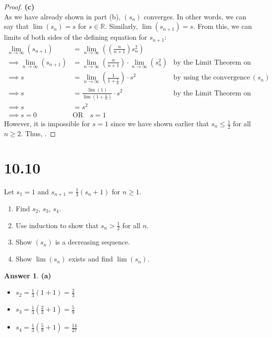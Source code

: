 \documentclass[10pt,a4paper]{article}
\theoremstyle{definition}
\newtheorem*{answer*}{Answer}
\begin{document}
\begin{proof}{\textbf{(c)}}
\\As we have already shown in part (b), $(s_n)$ converges. In other words, we can say that $\lim(s_n) = s$ for $s \in \mathbb{R}$. Similarly, $\lim(s_{n+1}) = s$. From this, we can limits of both sides of the defining equation for $s_{n+1}$:
\begin{align*}
\lim_{n \to \infty}(s_{n+1}) &= \lim_{n \to \infty}\left(\left(\frac{n}{n+1}\right) s_n^2\right)\\
\implies \lim_{n \to \infty}(s_{n+1}) &= \lim_{n \to \infty}\left(\frac{n}{n+1}\right) \cdot \lim_{n \to \infty}(s_n^2) &\text{by the Limit Theorem on Produts}\\
\implies s &= \lim_{n \to \infty}\left(\frac{1}{1 + \frac{1}{n}}\right) \cdot s^2 &\text{by using the convergence of $(s_n)$}\\
\implies s &= \frac{\lim(1)}{\lim(1 + \frac{1}{n})} \cdot s^2 &\text{by the Limit Theorem on Quotients}\\
\implies s &= s^2\\
\implies s = 0 \quad &\text{OR} \quad s = 1
\end{align*} 
However, it is impossible for $s = 1$ since we have shown earlier that $s_n \leq \frac{1}{2}$ for all $n \geq 2$. Thus, .
\end{proof}

\section*{10.10}
Let $s_1 = 1$ and $\displaystyle s_{n + 1} = \frac{1}{3}(s_n + 1)$ for $n \geq 1$.
\begin{enumerate}[label = (\alph*)]
\item Find $s_2$, $s_3$, $s_4$.
\item Use induction to show that $s_n > \frac{1}{2}$ for all $n$.
\item Show $(s_n)$ is a decreasing sequence.
\item Show $\lim(s_n)$ exists and find $\lim(s_n)$. 
\end{enumerate}

\begin{answer*}{\textbf{(a)}}
\begin{itemize}
\item $\displaystyle s_2 = \frac{1}{3}(1 + 1) = \frac{2}{3}$
\item $\displaystyle s_3 = \frac{1}{3}\left(\frac{2}{3} + 1\right) = \frac{5}{9}$
\item $\displaystyle s_4 = \frac{1}{3}\left(\frac{5}{9} + 1\right) = \frac{14}{27}$
\end{itemize}
\end{answer*}
\end{document}
